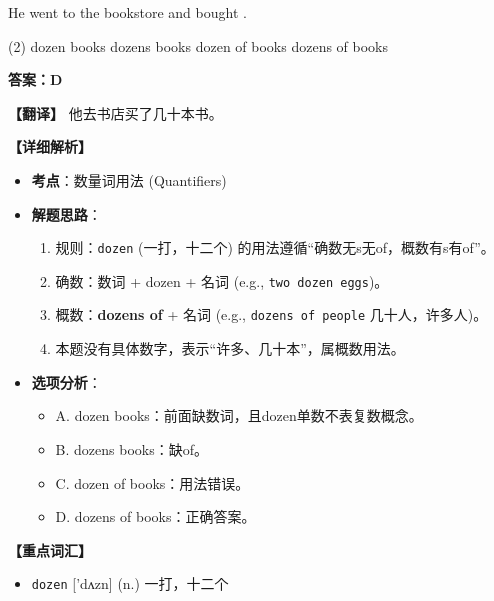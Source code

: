 \documentclass[11pt, a4paper]{article}
\newcommand{\analysis}[4]{
    \begin{solutionbox}
        \textbf{答案：#1}
        
        \textbf{【翻译】} #2
        
        \textbf{【详细解析】}
        #3
        
        \textbf{【重点词汇】}
        #4
    \end{solutionbox}
}
\newcommand{\blank}{\underline{\hspace{1.5cm}}}
\begin{document}
\begin{questions}
    \item He went to the bookstore and bought \blank.
    \begin{tasks}(2)
        \task dozen books \task dozens books
        \task dozen of books \task dozens of books
    \end{tasks}
    \analysis{D}{他去书店买了几十本书。}{
        \begin{itemize}
            \item \textbf{考点}：数量词用法 (Quantifiers)
            \item \textbf{解题思路}：
                \begin{enumerate}
                    \item 规则：\texttt{dozen} (一打，十二个) 的用法遵循“确数无s无of，概数有s有of”。
                    \item 确数：数词 + dozen + 名词 (e.g., \texttt{two dozen eggs})。
                    \item 概数：\textbf{dozens of} + 名词 (e.g., \texttt{dozens of people} 几十人，许多人)。
                    \item 本题没有具体数字，表示“许多、几十本”，属概数用法。
                \end{enumerate}
            \item \textbf{选项分析}：
                \begin{itemize}
                    \item A. dozen books：前面缺数词，且dozen单数不表复数概念。
                    \item B. dozens books：缺of。
                    \item C. dozen of books：用法错误。
                    \item D. dozens of books：正确答案。
                \end{itemize}
        \end{itemize}
    }{
        \begin{itemize}
            \item \texttt{dozen} ['dʌzn] (n.) 一打，十二个
        \end{itemize}
    }


\end{questions}
\end{document}
